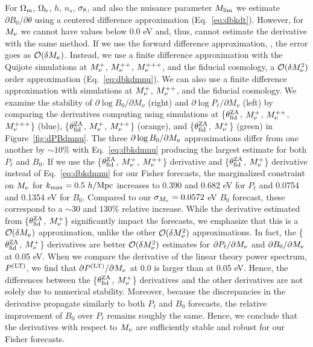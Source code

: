 For $\Omega_{\rm m}$, $\Omega_{\rm b}$, $h$, $n_s$, $\sigma_8$, and also the nuisance parameter $M_{\rm lim}$ 
we estimate $\partial B_0/\partial \theta$ using a centered difference approximation 
(Eq.~\ref{eq:dbkdt}). However, for $M_\nu$ we cannot have values below 0.0 eV 
and, thus, cannot estimate the derivative with the same method. If we use the 
forward difference approximation, 
\beq 
{} \approx {}, 
\eeq
the error goes as $\mathcal{O}(\delta M_\nu)$. Instead, we use a finite difference
approximation with the Quijote simulations at $M_\nu^{+}$, $M_\nu^{++}$, $M_\nu^{+++}$, 
and the fiducial cosmology, a $\mathcal{O}(\delta M_\nu^2)$ order approximation 
(Eq.~\ref{eq:dbkdmnu}). We can also use a finite difference approximation with 
simulations at $M_\nu^{+}$, $M_\nu^{++}$, and the fiducial cosmology. We examine
the stability of $\partial \log B_0/\partial M_\nu$ (right) and 
$\partial \log P_\ell/\partial M_\nu$ (left) by comparing the derivatives computing
using simulations at \{$\theta_{\rm fid}^{\rm ZA}$, $M_\nu^{+}$, $M_\nu^{++}$, $M_\nu^{+++}$\} (blue), 
\{$\theta_{\rm fid}^{\rm ZA}$, $M_\nu^{+}$, $M_\nu^{++}$\} (orange), and \{$\theta_{\rm fid}^{\rm ZA}$, $M_\nu^{+}$\} 
(green) in Figure~\ref{fig:dPBdmnu}. The three $\partial \log B_0/\partial M_\nu$
approximations differ from one another by $\sim10\%$ with Eq.~\ref{eq:dbkdmnu} 
producing the largest estimate for both $P_\ell$ and $B_0$. If we use the
\{$\theta_{\rm fid}^{\rm ZA}$, $M_\nu^{+}$, $M_\nu^{++}$\} derivative and 
\{$\theta_{\rm fid}^{\rm ZA}$, $M_\nu^{+}$\} derivative 
instead of Eq.~\ref{eq:dbkdmnu} for our Fisher forecasts, the marginalized constraint on
$M_\nu$ for $k_{\rm max} = 0.5~h/{\rm Mpc}$ increases to 0.390 and 0.682 eV for $P_\ell$ 
and 0.0754 and 0.1354 eV for $B_0$. Compared to our $\sigma_{M_\nu} = 0.0572$ eV 
$B_0$ forecast, these correspond to a $\sim30$ and $130\%$ relative increase. 
While the derivative estimated from \{$\theta_{\rm fid}^{\rm ZA}$, $M_\nu^{+}$\} significantly 
impact the forecasts, we emphasize that this is a $\mathcal{O}(\delta M_\nu)$ approximation, 
unlike the other $\mathcal{O}(\delta M_\nu^2)$ approximations. In fact, the 
\{$\theta_{\rm fid}^{\rm ZA}$, $M_\nu^{+}$\} derivatives are better $\mathcal{O}(\delta M_\nu^2)$ 
estimates for $\partial P_\ell/\partial M_\nu$ and $\partial B_0/\partial M_\nu$ at 0.05 eV. 
When we compare the derivative of the linear theory power spectrum, $P^{(\rm LT)}$, 
we find that $\partial P^{(\rm LT)}/\partial M_\nu$ at 0.0 is larger than at 0.05 eV. 
Hence, the differences between the \{$\theta_{\rm fid}^{\rm ZA}$, $M_\nu^{+}$\} derivatives 
and the other derivatives are not solely due to numerical stability. Moreover, because the 
discrepancies in the derivative propagate similarly to both $P_\ell$ and $B_0$ forecasts, 
the relative improvement of $B_0$ over $P_\ell$ remains roughly the same.
Hence, we conclude that the derivatives with respect to $M_\nu$ are sufficiently 
stable and robust for our Fisher forecasts.

